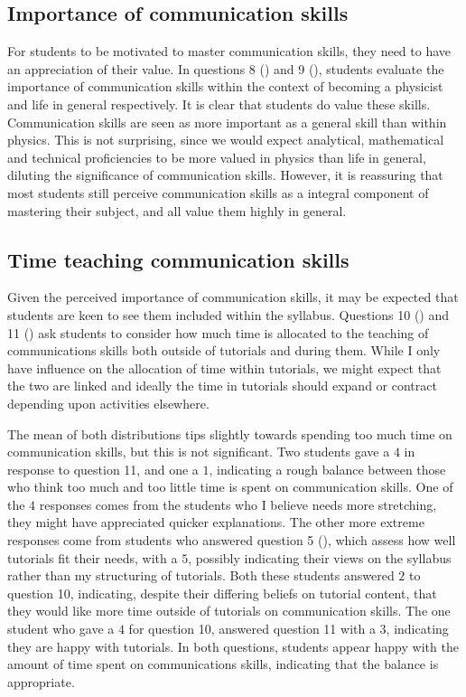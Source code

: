 \subsection{Importance of communication skills}\label{sec:comm-value}

For students to be motivated to master communication skills, they need to have an appreciation of their value. In questions 8 () and 9 (), students evaluate the importance of communication skills within the context of becoming a physicist and life in general respectively. It is clear that students do value these skills. Communication skills are seen as more important as a general skill than within physics. This is not surprising, since we would expect analytical, mathematical and technical proficiencies to be more valued in physics than life in general, diluting the significance of communication skills. However, it is reassuring that most students still perceive communication skills as a integral component of mastering their subject, and all value them highly in general.

\subsection{Time teaching communication skills}\label{sec:comm-time}

Given the perceived importance of communication skills, it may be expected that students are keen to see them included within the syllabus. Questions 10 () and 11 () ask students to consider how much time is allocated to the teaching of communications skills both outside of tutorials and during them. While I only have influence on the allocation of time within tutorials, we might expect that the two are linked and ideally the time in tutorials should expand or contract depending upon activities elsewhere.

The mean of both distributions tips slightly towards spending too much time on communication skills, but this is not significant. Two students gave a $4$ in response to question 11, and one a $1$, indicating a rough balance between those who think too much and too little time is spent on communication skills. One of the $4$ responses comes from the students who I believe needs more stretching, they might have appreciated quicker explanations. The other more extreme responses come from students who answered question 5 (), which assess how well tutorials fit their needs, with a $5$, possibly indicating their views on the syllabus rather than my structuring of tutorials. Both these students answered $2$ to question 10, indicating, despite their differing beliefs on tutorial content, that they would like more time outside of tutorials on communication skills. The one student who gave a $4$ for question 10, answered question 11 with a $3$, indicating they are happy with tutorials. In both questions, students appear happy with the amount of time spent on communications skills, indicating that the balance is appropriate.

